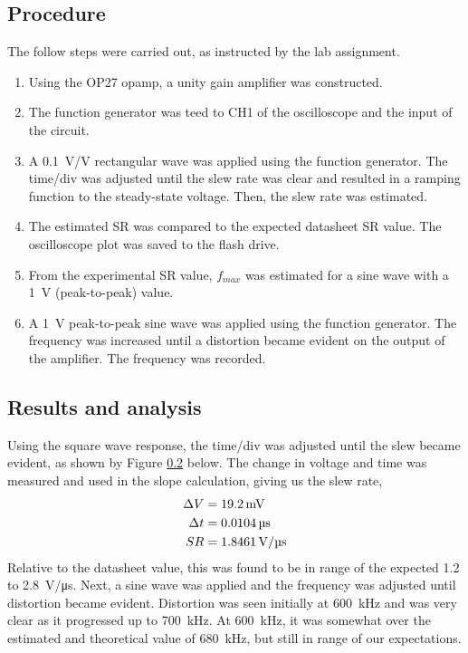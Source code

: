 \documentclass{report}
\begin{document}
\subsection{Procedure}
The follow steps were carried out, as instructed by the lab assignment.
\begin{enumerate}
	\item Using the OP27 opamp, a unity gain amplifier was constructed.
	\item The function generator was teed to CH1 of the oscilloscope and the input of the circuit.
	\item A \SI{0.1}{\V/\V} rectangular wave was applied using the function generator. The time/div was adjusted until the slew rate was clear and resulted in a ramping function to the steady-state voltage. Then, the slew rate was estimated.
	\item The estimated SR was compared to the expected datasheet SR value. The oscilloscope plot was saved to the flash drive.
	\item From the experimental SR value, $f_{max}$ was estimated for a sine wave with a \SI{1}{\V} (peak-to-peak) value. 
	\item A \SI{1}{\V} peak-to-peak sine wave was applied using the function generator. The frequency was increased until a distortion became evident on the output of the amplifier. The frequency was recorded.
\end{enumerate}

\subsection{Results and analysis}

Using the square wave response, the time/div was adjusted until the slew became evident, as shown by Figure \ref{} below. The change in voltage and time was measured and used in the slope calculation, giving us the slew rate, \begin{align}
\Delta V & = \SI{19.2}{\mV} \notag \\
\Delta t & = \SI{0.0104}{\us}  \notag\\
SR & = \SI{1.8461}{\V/\us}
\end{align}
Relative to the datasheet value, this was found to be in range of the expected \num{1.2} to \SI{2.8}{\V/\us}. Next, a sine wave was applied and the frequency was adjusted until distortion became evident. Distortion was seen initially at \SI{600}{\kHz} and was very clear as it progressed up to \SI{700}{\kHz}. At \SI{600}{\kHz}, it was somewhat over the estimated and theoretical value of \SI{680}{\kHz}, but still in range of our expectations.
\end{document}
